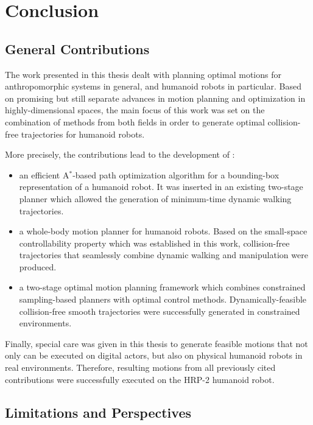 \chapter{Conclusion}
\label{chap:conclusion}

\section{General Contributions}

The work presented in this thesis dealt with planning optimal motions
for anthropomorphic systems in general, and humanoid robots in
particular. Based on promising but still separate advances in
motion planning and optimization in highly-dimensional spaces, the
main focus of this work was set on the combination of methods from
both fields in order to generate optimal collision-free trajectories
for humanoid robots. 

More precisely, the contributions lead to the development of :
\begin{itemize}
\item an efficient A$^*$-based path optimization algorithm for a
  bounding-box representation of a humanoid robot. It was inserted in
  an existing two-stage planner which allowed the generation of
  minimum-time dynamic walking trajectories.
\item a whole-body motion planner for humanoid robots. Based on the
  small-space controllability property which was established in this
  work, collision-free trajectories that seamlessly combine dynamic
  walking and manipulation were produced.
\item a two-stage optimal motion planning framework which combines
  constrained sampling-based planners with optimal control
  methods. Dynamically-feasible collision-free smooth trajectories
  were successfully generated in constrained environments.
\end{itemize}

Finally, special care was given in this thesis to generate feasible
motions that not only can be executed on digital actors, but also on
physical humanoid robots in real environments. Therefore, resulting
motions from all previously cited contributions were successfully
executed on the HRP-2 humanoid robot.

\section{Limitations and Perspectives}

